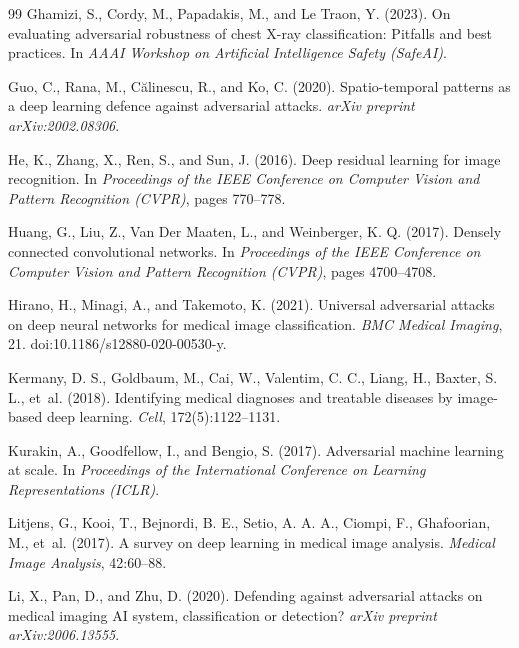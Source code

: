 \documentclass[12pt,a4paper,oneside]{report}
\begin{document}
\begin{thebibliography}{99}
Ghamizi, S., Cordy, M., Papadakis, M., and Le Traon, Y. (2023).
\newblock On evaluating adversarial robustness of chest X-ray classification: Pitfalls and best practices.
\newblock In \emph{AAAI Workshop on Artificial Intelligence Safety (SafeAI)}.

Guo, C., Rana, M., C{\u{a}}linescu, R., and Ko, C. (2020).
\newblock Spatio-temporal patterns as a deep learning defence against adversarial attacks.
\newblock \emph{arXiv preprint arXiv:2002.08306}.

He, K., Zhang, X., Ren, S., and Sun, J. (2016).
\newblock Deep residual learning for image recognition.
\newblock In \emph{Proceedings of the IEEE Conference on Computer Vision and Pattern Recognition (CVPR)}, pages 770--778.

Huang, G., Liu, Z., Van Der Maaten, L., and Weinberger, K. Q. (2017).
\newblock Densely connected convolutional networks.
\newblock In \emph{Proceedings of the IEEE Conference on Computer Vision and Pattern Recognition (CVPR)}, pages 4700--4708.

Hirano, H., Minagi, A., and Takemoto, K. (2021).
\newblock Universal adversarial attacks on deep neural networks for medical image classification.
\newblock \emph{BMC Medical Imaging}, 21.
\newblock doi:10.1186/s12880-020-00530-y.

Kermany, D. S., Goldbaum, M., Cai, W., Valentim, C. C., Liang, H., Baxter, S. L., et~al. (2018).
\newblock Identifying medical diagnoses and treatable diseases by image-based deep learning.
\newblock \emph{Cell}, 172(5):1122--1131.

Kurakin, A., Goodfellow, I., and Bengio, S. (2017).
\newblock Adversarial machine learning at scale.
\newblock In \emph{Proceedings of the International Conference on Learning Representations (ICLR)}.

Litjens, G., Kooi, T., Bejnordi, B. E., Setio, A. A. A., Ciompi, F., Ghafoorian, M., et~al. (2017).
\newblock A survey on deep learning in medical image analysis.
\newblock \emph{Medical Image Analysis}, 42:60--88.

Li, X., Pan, D., and Zhu, D. (2020).
\newblock Defending against adversarial attacks on medical imaging AI system, classification or detection?
\newblock \emph{arXiv preprint arXiv:2006.13555}.


\end{thebibliography}
\end{document}
